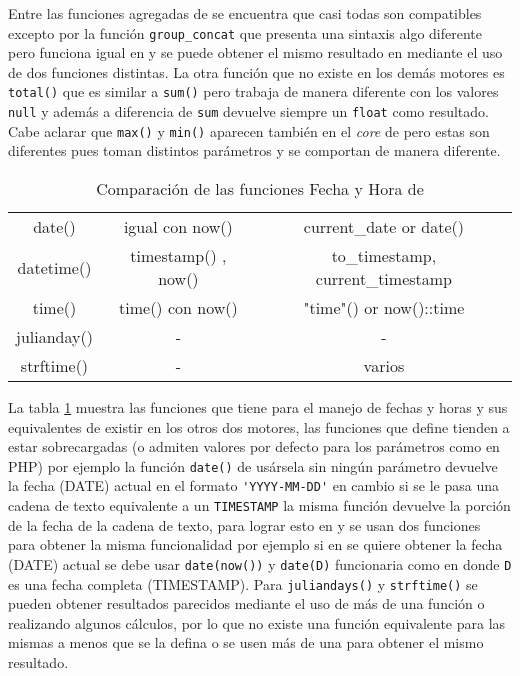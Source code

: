Entre las funciones agregadas de \s se encuentra que casi todas son compatibles excepto por la función \verb=group_concat= que presenta una sintaxis algo diferente pero funciona igual en \m y se puede obtener el mismo resultado en \p mediante el uso de dos funciones distintas. La otra función que no existe en los demás motores es \verb=total()= que es similar a \verb=sum()= pero  trabaja de manera diferente con los valores \verb=null= y además a diferencia de \verb=sum= devuelve siempre un \verb=float= como resultado. Cabe aclarar que \verb=max()= y \verb=min()= aparecen también en el \textit{core} de \s pero estas son diferentes pues toman distintos parámetros y se comportan de manera diferente.

\begin{table}[h]
\begin{center}
{
\selectfont
\begin{tabular}{|c|c|c|}
\hline 
\s & \m & \p \\ 
\hline 
date() & igual con now() & current\_date or date() \\ 
\hline 
datetime() & timestamp() , now() & to\_timestamp, current\_timestamp \\ 
\hline 
time() & time() con now() & "time"() or now()::time \\ 
\hline 
julianday() & - & - \\ 
\hline 
strftime() & - & varios \\ 
\hline 
\end{tabular} 
}
\end{center}
\caption{Comparación de las funciones Fecha y Hora de \s}
\label{table:functions:dates}
\end{table}

La tabla \ref{table:functions:dates} muestra las funciones que tiene \s para el manejo de fechas y horas y sus equivalentes de existir en los otros dos motores, las funciones que define \s tienden a estar sobrecargadas (o admiten valores por defecto para los parámetros como en PHP) por ejemplo la función \verb=date()= de usársela sin ningún parámetro devuelve la fecha (DATE) actual en el formato \verb='YYYY-MM-DD'= en cambio si se le pasa una cadena de texto equivalente a un \verb=TIMESTAMP= la misma función devuelve la porción de la fecha de la cadena de texto, para lograr esto en \m y \p se usan dos funciones para obtener la misma funcionalidad por ejemplo si en \s se quiere obtener la fecha (DATE) actual se debe usar \verb=date(now())= y \verb=date(D)= funcionaria como en \s donde \verb=D= es una fecha completa (TIMESTAMP). Para \verb=juliandays()= y \verb=strftime()= se pueden obtener resultados parecidos mediante el uso de más de una función o realizando algunos cálculos, por lo que no existe una función equivalente para las mismas a menos que se la defina o se usen  más de una para obtener el mismo resultado.

